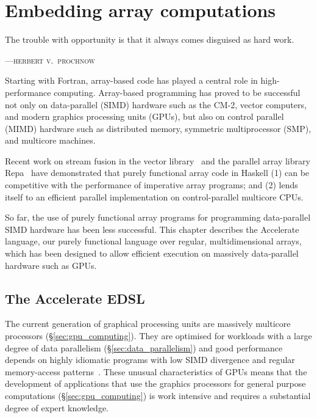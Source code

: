 %

\chapter{Embedding array computations}
\label{ch:accelerate}

\epigraph{The trouble with opportunity is that it always comes disguised as hard work.}%
{\textsc{---herbert v.\ prochnow}}


Starting with Fortran, array-based code has played a central role in
high-performance computing. Array-based programming has proved to be successful
not only on data-parallel (SIMD) hardware such as the CM-2, vector computers,
and modern graphics processing units (GPUs\gpu{}), but also on control parallel
(MIMD) hardware such as distributed memory, symmetric multiprocessor (SMP), and
multicore machines.

Recent work on stream fusion in the vector
library~\cite{Coutts:2007kp,Mainland:2013ez} and the parallel array library
Repa~\cite{Keller:2010er,Lippmeier:2011cd,Lippmeier:2012gx} have demonstrated
that purely functional array code in Haskell (1) can be competitive with the
performance of imperative array programs; and (2) lends itself to an efficient
parallel implementation on control-parallel multicore CPUs.

So far, the use of purely functional array programs for programming
data-parallel SIMD hardware has been less successful. This chapter describes the
Accelerate language, our purely functional language over regular,
multidimensional arrays, which has been designed to allow efficient execution on
massively data-parallel hardware such as GPUs.


\section{The Accelerate EDSL}
\label{sec:accelerate}

The current generation of graphical processing units are massively multicore
processors (\S\ref{sec:gpu_computing}). They are optimised for workloads with a
large degree of data parallelism (\S\ref{sec:data_parallelism}) and good
performance depends on highly idiomatic programs with low SIMD divergence and
regular memory-access patterns~\cite{NVIDIA:2012wf}. These unusual
characteristics of GPUs means that the development of applications that use the
graphics processors for general purpose computations (\S\ref{sec:gpu_computing})
is work intensive and requires a substantial degree of expert knowledge.


